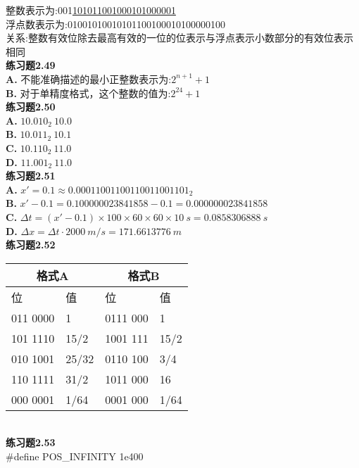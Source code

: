 \documentclass{article}
\begin{document}
\begin{CJK}{UTF8}{uyhei}
整数表示为:\hspace{4em}001\underline{101011001000101000001}	\\
浮点数表示为:01001010010101100100010100000100	\\
关系:整数有效位除去最高有效的一位的位表示与浮点表示小数部分的有效位表示相同	\\[3ex]
\textbf{练习题2.49}	\\[2ex]
\textbf{A.} 不能准确描述的最小正整数表示为:$2^{n+1}+1$	\\
\textbf{B.} 对于单精度格式，这个整数的值为:$2^{24}+1$	\\[3ex]
\textbf{练习题2.50}	\\[2ex]
\textbf{A.} $10.010_2\ 10.0$	\\
\textbf{B.} $10.011_2\ 10.1$	\\
\textbf{C.} $10.110_2\ 11.0$	\\
\textbf{D.} $11.001_2\ 11.0$	\\[2ex]
\textbf{练习题2.51}	\\[2ex]
\textbf{A.} $x'=0.1\approx 0.00011001100110011001101_2$	\\
\textbf{B.} $x'-0.1=0.100000023841858-0.1=0.000000023841858$	\\
\textbf{C.} $\Delta t=(x'-0.1)\times 100\times 60\times 60\times 10\ s=0.0858306888\ s$	\\
\textbf{D.} $\Delta x=\Delta t \cdot 2000\ m/s=171.6613776\ m$	\\[2ex]
\textbf{练习题2.52}
\begin{table}[htbp]
\centering
\begin{tabular}{|m{5em}<{\centering}|m{5em}<{\centering}|m{5em}<{\centering}|m{5em}<{\centering}|}
	\hline
	\multicolumn{2}{|c|}{格式A}	&	\multicolumn{2}{c|}{格式B}	\\
	\hline
	位	&	值	&	位	&	值	\\
	\hline
	011 0000	&	1	&	0111 000	&	1	\\
	\hline
	101 1110	&	15/2	&	1001 111	&	15/2	\\
	\hline
	010 1001	&	25/32	&	0110 100	&	3/4	\\
	\hline
	110 1111	&	31/2	&	1011 000	&	16	\\
	\hline
	000 0001	&	1/64	&	0001 000	&	1/64	\\
	\hline
\end{tabular}
\end{table}	\\[2ex]
\textbf{练习题2.53}	\\[2ex]
\#define POS\_INFINITY	1e400	\\

\end{CJK}
\end{document}
